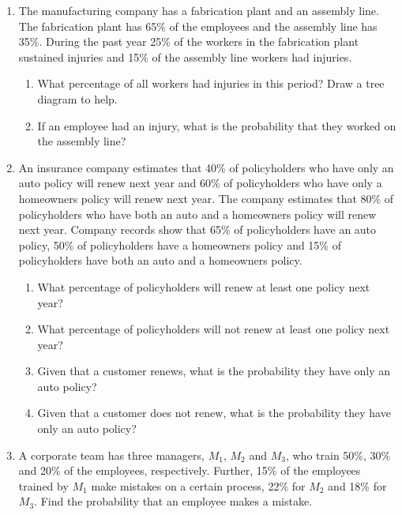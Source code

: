 \documentclass{article}
\begin{document}
\begin{enumerate}
    
    \item The manufacturing company has a fabrication plant and an assembly line. The fabrication plant has 65\% of the employees and the assembly line has 35\%. During the past year 25\% of the workers in the fabrication plant sustained injuries and 15\% of the assembly line workers had injuries.%
    \begin{enumerate}
        \item What percentage of all workers had injuries in this period? Draw a tree diagram to help.\vspace{100pt}
        \item If an employee had an injury, what is the probability that they worked on the assembly line?\vspace{40pt}
    \end{enumerate}\bigskip
    
    \item An insurance company estimates that 40\% of policyholders who have only an auto policy will renew next year and 60\% of policyholders who have only a homeowners policy will renew next year. The company estimates that 80\% of policyholders who have both an auto and a homeowners policy will renew next year. Company records show that 65\% of policyholders have an auto policy, 50\% of policyholders have a homeowners policy and 15\% of policyholders have both an auto and a homeowners policy.%
    \begin{enumerate}
        \item What percentage of policyholders will renew at least one policy next year?\vspace{100pt}
        \item What percentage of policyholders will not renew at least one policy next year?\vspace{40pt}
        \item Given that a customer renews, what is the probability they have only an auto policy?\vspace{40pt}
        \item Given that a customer does not renew, what is the probability they have only an auto policy?\vspace{40pt}
    \end{enumerate}\bigskip
    
    \item A corporate team has three managers, $M_1$, $M_2$ and $M_3$, who train 50\%, 30\% and 20\% of the employees, respectively. Further, 15\% of the employees trained by $M_1$ make mistakes on a certain process, 22\% for $M_2$ and 18\% for $M_3$. Find the probability that an employee makes a mistake.\vspace{100pt}
    

\end{enumerate}
\end{document}
